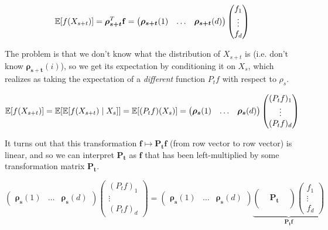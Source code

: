 \begin{example}
			\begin{equation}
				\operatorname{\mathbb{E}}[f(X_{s + t})] = \boldsymbol{\rho_{s + t}}^T \mathbf{f} = \begin{pmatrix} \boldsymbol{\rho_{s + t}} (1) & \ldots &  \boldsymbol{\rho_{s + t}} (d) \end{pmatrix} \begin{pmatrix} f_1 \\ \vdots \\ f_d \end{pmatrix}
			\end{equation}

		The problem is that we don't know what the distribution of $X_{s + t}$ is (i.e. don't know $\boldsymbol{\rho_{s + t}} (i)$), so we get its expectation by conditioning it on $X_s$, which realizes as taking the expectation of a \textit{different} function $P_t f$ with respect to $\rho_s$. 

			\begin{equation}
				\operatorname{\mathbb{E}}[f(X_{s + t})] = \operatorname{\mathbb{E}}[ \operatorname{\mathbb{E}}[ f(X_{s + t}) \mid X_s]] = \operatorname{\mathbb{E}}[(P_t f)(X_s)] = \begin{pmatrix} \boldsymbol{\rho_s} (1) & \ldots & \boldsymbol{\rho_s} (d) \end{pmatrix} \begin{pmatrix} (P_t f)_1 \\ \vdots \\(P_t f)_d \end{pmatrix}
			\end{equation}

		It turns out that this transformation $\mathbf{f} \mapsto \mathbf{P_t} \mathbf{f}$ (from row vector to row vector) is linear, and so we can interpret $\mathbf{P_t}$ as $\mathbf{f}$ that has been left-multiplied by some transformation matrix $\mathbf{P_t}$. 

			\begin{equation}
				\begin{pmatrix} \boldsymbol{\rho_s} (1) & \ldots & \boldsymbol{\rho_s} (d) \end{pmatrix} \begin{pmatrix} (P_t f)_1 \\ \vdots \\(P_t f)_d \end{pmatrix} = \begin{pmatrix} \boldsymbol{\rho_s} (1) & \ldots & \boldsymbol{\rho_s} (d) \end{pmatrix} \underbrace{\begin{pmatrix} && \\ & \mathbf{P_t} & \\ && \end{pmatrix} \begin{pmatrix} f_1 \\ \vdots \\ f_d \end{pmatrix}}_{\mathbf{P_t f}}
			\end{equation}


\end{example}
